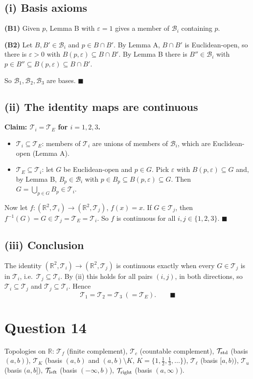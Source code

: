\documentclass[11pt]{article}
\newcommand{\R}{\mathbb{R}}
\newcommand{\T}{\mathcal{T}}
\newcommand{\B}{\mathcal{B}}
\begin{document}
\subsection*{(i) Basis axioms}
\textbf{(B1)} Given $p$, Lemma B with $\varepsilon=1$ gives a member of $\B_i$ containing $p$.

\textbf{(B2)} Let $B,B'\in\B_i$ and $p\in B\cap B'$. By Lemma A, $B\cap B'$ is Euclidean-open, so there is $\varepsilon>0$ with $B(p,\varepsilon)\subseteq B\cap B'$. By Lemma B there is $B''\in\B_i$ with $p\in B''\subseteq B(p,\varepsilon)\subseteq B\cap B'$.

So $\B_1,\B_2,\B_3$ are bases. $\blacksquare$

\subsection*{(ii) The identity maps are continuous}
\textbf{Claim: $\T_i=\T_E$ for $i=1,2,3$.}
\begin{itemize}[nosep]
\item $\T_i\subseteq\T_E$: members of $\T_i$ are unions of members of $\B_i$, which are Euclidean-open (Lemma A).
\item $\T_E\subseteq\T_i$: let $G$ be Euclidean-open and $p\in G$. Pick $\varepsilon$ with $B(p,\varepsilon)\subseteq G$ and, by Lemma B, $B_p\in\B_i$ with $p\in B_p\subseteq B(p,\varepsilon)\subseteq G$. Then $G=\bigcup_{p\in G}B_p\in\T_i$.
\end{itemize}
Now let $f:(\R^2,\T_i)\to(\R^2,\T_j)$, $f(x)=x$. If $G\in\T_j$, then $f^{-1}(G)=G\in\T_j=\T_E=\T_i$. So $f$ is continuous for all $i,j\in\{1,2,3\}$. $\blacksquare$

\subsection*{(iii) Conclusion}
The identity $(\R^2,\T_i)\to(\R^2,\T_j)$ is continuous exactly when every $G\in\T_j$ is in $\T_i$, i.e.\ $\T_j\subseteq\T_i$. By (ii) this holds for all pairs $(i,j)$, in both directions, so $\T_i\subseteq\T_j$ and $\T_j\subseteq\T_i$. Hence
\[
\T_1=\T_2=\T_3\ (=\T_E).\qquad\blacksquare
\]

\section*{Question 14}
Topologies on $\R$:
$\T_f$ (finite complement), $\T_c$ (countable complement), $\T_{\rm std}$ (basis $(a,b)$), $\T_K$ (basis $(a,b)$ and $(a,b)\setminus K$, $K=\{1,\tfrac12,\tfrac13,\dots\}$), $\T_\ell$ (basis $[a,b)$), $\T_u$ (basis $(a,b]$), $\T_{\rm left}$ (basis $(-\infty,b)$), $\T_{\rm right}$ (basis $(a,\infty)$).
\end{document}
